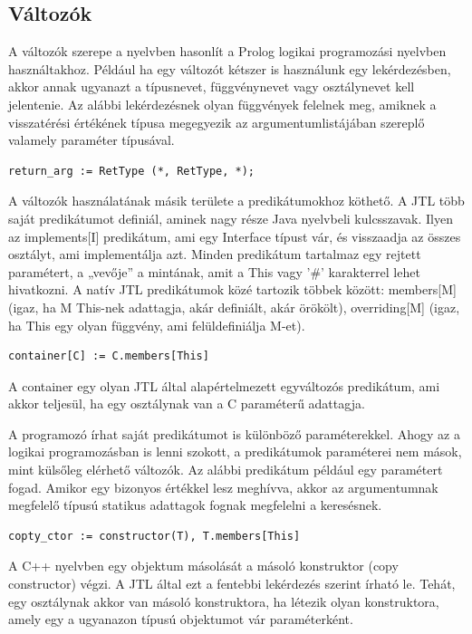 \documentclass[a4paper,12pt]{report}
\begin{document}
\subsection{Változók}
A változók szerepe a nyelvben hasonlít a Prolog logikai programozási nyelvben használtakhoz. Például ha egy változót kétszer is használunk egy lekérdezésben, akkor annak ugyanazt a típusnevet, függvénynevet vagy osztálynevet kell jelentenie. Az alábbi lekérdezésnek olyan függvények felelnek meg, amiknek a visszatérési értékének típusa megegyezik az argumentumlistájában szereplő valamely paraméter típusával.
\begin{verbatim}
return_arg := RetType (*, RetType, *);
\end{verbatim}
\par A változók használatának másik területe a predikátumokhoz köthető. A JTL több saját predikátumot definiál, aminek nagy része Java nyelvbeli kulcsszavak. Ilyen az implements[I] predikátum, ami egy Interface típust vár, és visszaadja az összes osztályt, ami implementálja azt. Minden predikátum tartalmaz egy rejtett paramétert, a „vevője” a mintának, amit a This vagy ’\#’ karakterrel lehet hivatkozni. A natív JTL predikátumok közé tartozik többek között: members[M] (igaz, ha M This-nek adattagja, akár definiált, akár örökölt), overriding[M] (igaz, ha This egy olyan függvény, ami felüldefiniálja M-et).
\begin{verbatim}
container[C] := C.members[This]
\end{verbatim}
\par A container egy olyan JTL által alapértelmezett egyváltozós predikátum, ami akkor teljesül, ha egy osztálynak van a C paraméterű adattagja.
\par A programozó írhat saját predikátumot is különböző paraméterekkel. Ahogy az a logikai programozásban is lenni szokott, a predikátumok paraméterei nem mások, mint külsőleg elérhető változók. Az alábbi predikátum például egy paramétert fogad. Amikor egy bizonyos értékkel lesz meghívva, akkor az argumentumnak megfelelő típusú statikus adattagok fognak megfelelni a keresésnek.
\begin{verbatim}
copty_ctor := constructor(T), T.members[This]
\end{verbatim}
A C++ nyelvben egy objektum másolását a másoló konstruktor (copy constructor) végzi. A JTL által ezt a fentebbi lekérdezés szerint írható le. Tehát, egy osztálynak akkor van másoló konstruktora, ha létezik olyan konstruktora, amely egy a ugyanazon típusú objektumot vár paraméterként.
\end{document}
